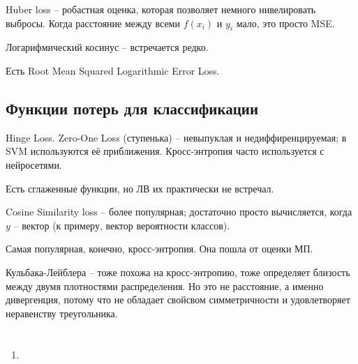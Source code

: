 \documentclass[a4paper,12pt]{article}
\begin{document}
Huber loss -- робастная оценка, которая позволяет немного нивелировать выбросы.
Когда расстояние между всеми $ f(x_i) $ и $ y_i $ мало, это просто MSE.

Логарифмический косинус -- встречается редко.

Есть Root Mean Squared Logarithmic Error Loss.

\subsection{Функции потерь для классификации}

Hinge Loss.
Zero-One Loss (ступенька) -- невыпуклая и недиффиренцируемая; в SVM используются её приближения.
Кросс-энтропия часто используется с нейросетями.

Есть сглаженные функции, но ЛВ их практически не встречал.

Cosine Similarity loss -- более популярная; достаточно просто вычисляется, когда $ y $ -- вектор (к примеру, вектор вероятности классов).

Самая популярная, конечно, кросс-энтропия.
Она пошла от оценки МП.

Кульбака-Лейблера -- тоже похожа на кросс-энтропию, тоже определяет близость между двумя плотностями распределения.
Но это не расстояние, а именно дивергенция, потому что не обладает свойсвом симметричности и удовлетворяет неравенству треугольника.

\section{}
\subsection{}

\begin{enumerate}[noitemsep]
	\item 
\end{enumerate}
	
	
\end{document}
